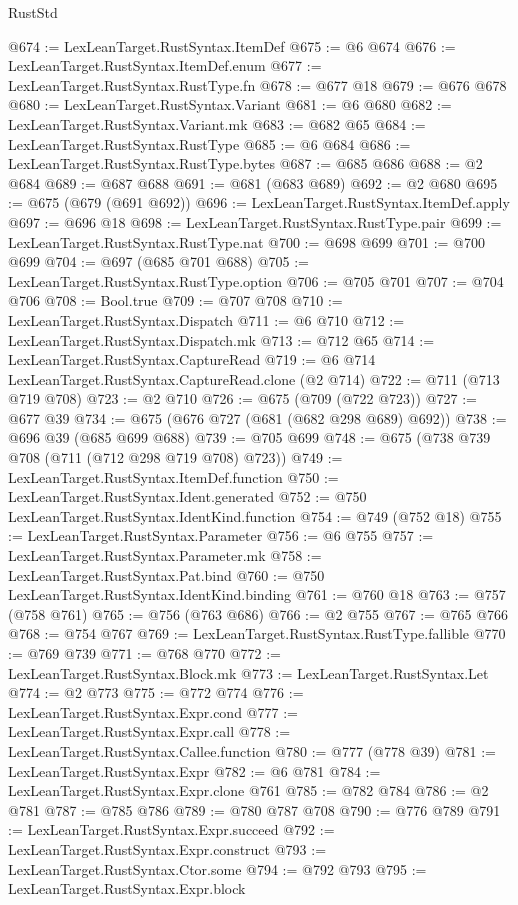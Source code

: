 \begin{lexlean}{RustStd}
\begin{coremodule}
@674 := LexLeanTarget.RustSyntax.ItemDef
@675 := @6 @674
@676 := LexLeanTarget.RustSyntax.ItemDef.enum
@677 := LexLeanTarget.RustSyntax.RustType.fn
@678 := @677 @18
@679 := @676 @678
@680 := LexLeanTarget.RustSyntax.Variant
@681 := @6 @680
@682 := LexLeanTarget.RustSyntax.Variant.mk
@683 := @682 @65
@684 := LexLeanTarget.RustSyntax.RustType
@685 := @6 @684
@686 := LexLeanTarget.RustSyntax.RustType.bytes
@687 := @685 @686
@688 := @2 @684
@689 := @687 @688
@691 := @681 (@683 @689)
@692 := @2 @680
@695 := @675 (@679 (@691 @692))
@696 := LexLeanTarget.RustSyntax.ItemDef.apply
@697 := @696 @18
@698 := LexLeanTarget.RustSyntax.RustType.pair
@699 := LexLeanTarget.RustSyntax.RustType.nat
@700 := @698 @699
@701 := @700 @699
@704 := @697 (@685 @701 @688)
@705 := LexLeanTarget.RustSyntax.RustType.option
@706 := @705 @701
@707 := @704 @706
@708 := Bool.true
@709 := @707 @708
@710 := LexLeanTarget.RustSyntax.Dispatch
@711 := @6 @710
@712 := LexLeanTarget.RustSyntax.Dispatch.mk
@713 := @712 @65
@714 := LexLeanTarget.RustSyntax.CaptureRead
@719 := @6 @714 LexLeanTarget.RustSyntax.CaptureRead.clone (@2 @714)
@722 := @711 (@713 @719 @708)
@723 := @2 @710
@726 := @675 (@709 (@722 @723))
@727 := @677 @39
@734 := @675 (@676 @727 (@681 (@682 @298 @689) @692))
@738 := @696 @39 (@685 @699 @688)
@739 := @705 @699
@748 := @675 (@738 @739 @708 (@711 (@712 @298 @719 @708) @723))
@749 := LexLeanTarget.RustSyntax.ItemDef.function
@750 := LexLeanTarget.RustSyntax.Ident.generated
@752 := @750 LexLeanTarget.RustSyntax.IdentKind.function
@754 := @749 (@752 @18)
@755 := LexLeanTarget.RustSyntax.Parameter
@756 := @6 @755
@757 := LexLeanTarget.RustSyntax.Parameter.mk
@758 := LexLeanTarget.RustSyntax.Pat.bind
@760 := @750 LexLeanTarget.RustSyntax.IdentKind.binding
@761 := @760 @18
@763 := @757 (@758 @761)
@765 := @756 (@763 @686)
@766 := @2 @755
@767 := @765 @766
@768 := @754 @767
@769 := LexLeanTarget.RustSyntax.RustType.fallible
@770 := @769 @739
@771 := @768 @770
@772 := LexLeanTarget.RustSyntax.Block.mk
@773 := LexLeanTarget.RustSyntax.Let
@774 := @2 @773
@775 := @772 @774
@776 := LexLeanTarget.RustSyntax.Expr.cond
@777 := LexLeanTarget.RustSyntax.Expr.call
@778 := LexLeanTarget.RustSyntax.Callee.function
@780 := @777 (@778 @39)
@781 := LexLeanTarget.RustSyntax.Expr
@782 := @6 @781
@784 := LexLeanTarget.RustSyntax.Expr.clone @761
@785 := @782 @784
@786 := @2 @781
@787 := @785 @786
@789 := @780 @787 @708
@790 := @776 @789
@791 := LexLeanTarget.RustSyntax.Expr.succeed
@792 := LexLeanTarget.RustSyntax.Expr.construct
@793 := LexLeanTarget.RustSyntax.Ctor.some
@794 := @792 @793
@795 := LexLeanTarget.RustSyntax.Expr.block

\end{coremodule}
\end{lexlean}
